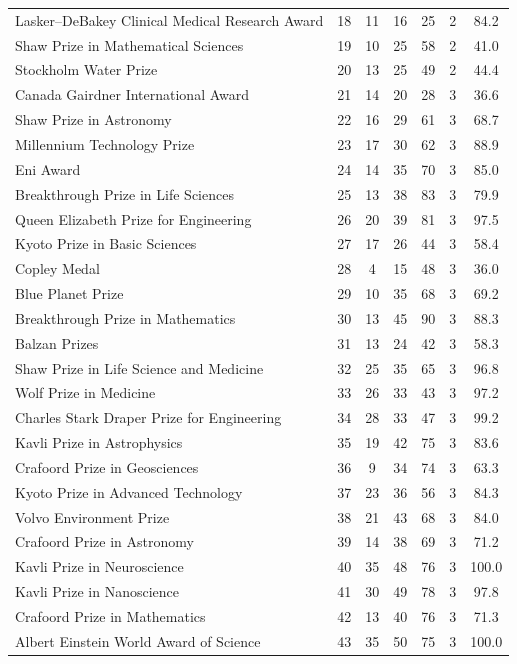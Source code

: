 \begin{longtable}{>{\raggedright\arraybackslash}p{6.6cm}cccccc}
Lasker–DeBakey Clinical Medical Research Award & 18 & 11 & 16 & 25 & 2 & 84.2 \\ 
Shaw Prize in Mathematical Sciences & 19 & 10 & 25 & 58 & 2 & 41.0 \\ 
Stockholm Water Prize & 20 & 13 & 25 & 49 & 2 & 44.4 \\ 
Canada Gairdner International Award & 21 & 14 & 20 & 28 & 3 & 36.6 \\ 
Shaw Prize in Astronomy & 22 & 16 & 29 & 61 & 3 & 68.7 \\ 
Millennium Technology Prize & 23 & 17 & 30 & 62 & 3 & 88.9 \\ 
Eni Award & 24 & 14 & 35 & 70 & 3 & 85.0 \\ 
Breakthrough Prize in Life Sciences & 25 & 13 & 38 & 83 & 3 & 79.9 \\ 
Queen Elizabeth Prize for Engineering & 26 & 20 & 39 & 81 & 3 & 97.5 \\ 
Kyoto Prize in Basic Sciences & 27 & 17 & 26 & 44 & 3 & 58.4 \\ 
Copley Medal & 28 & 4 & 15 & 48 & 3 & 36.0 \\ 
Blue Planet Prize & 29 & 10 & 35 & 68 & 3 & 69.2 \\ 
Breakthrough Prize in Mathematics & 30 & 13 & 45 & 90 & 3 & 88.3 \\ 
Balzan Prizes & 31 & 13 & 24 & 42 & 3 & 58.3 \\ 
Shaw Prize in Life Science and Medicine & 32 & 25 & 35 & 65 & 3 & 96.8 \\ 
Wolf Prize in Medicine & 33 & 26 & 33 & 43 & 3 & 97.2 \\ 
Charles Stark Draper Prize for Engineering & 34 & 28 & 33 & 47 & 3 & 99.2 \\ 
Kavli Prize in Astrophysics & 35 & 19 & 42 & 75 & 3 & 83.6 \\ 
Crafoord Prize in Geosciences & 36 & 9 & 34 & 74 & 3 & 63.3 \\ 
Kyoto Prize in Advanced Technology & 37 & 23 & 36 & 56 & 3 & 84.3 \\ 
Volvo Environment Prize & 38 & 21 & 43 & 68 & 3 & 84.0 \\ 
Crafoord Prize in Astronomy & 39 & 14 & 38 & 69 & 3 & 71.2 \\ 
Kavli Prize in Neuroscience & 40 & 35 & 48 & 76 & 3 & 100.0 \\ 
Kavli Prize in Nanoscience & 41 & 30 & 49 & 78 & 3 & 97.8 \\ 
Crafoord Prize in Mathematics & 42 & 13 & 40 & 76 & 3 & 71.3 \\ 
Albert Einstein World Award of Science & 43 & 35 & 50 & 75 & 3 & 100.0 \\ 

\end{longtable}
